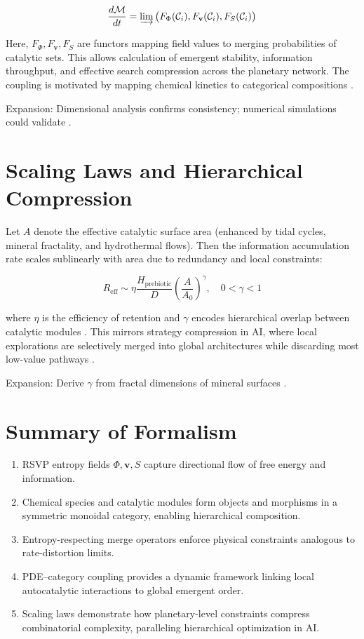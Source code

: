 \documentclass[openany]{book}
\begin{document}
\[\frac{d \mathcal{M}}{dt} = \varinjlim\big(F_\Phi(\mathcal{C}_i), F_\mathbf{v}(\mathcal{C}_i), F_S(\mathcal{C}_i)\big)\]

Here, $F_\Phi, F_\mathbf{v}, F_S$ are functors mapping field values to merging probabilities of catalytic sets. This allows calculation of emergent stability, information throughput, and effective search compression across the planetary network. The coupling is motivated by mapping chemical kinetics to categorical compositions \citep{steel2013}.

Expansion: Dimensional analysis confirms consistency; numerical simulations could validate \citep{peng2020}.

\section{Scaling Laws and Hierarchical Compression}
Let $A$ denote the effective catalytic surface area (enhanced by tidal cycles, mineral fractality, and hydrothermal flows). Then the information accumulation rate scales sublinearly with area due to redundancy and local constraints:

\[R_{\mathrm{eff}} \sim \eta \frac{H_{\mathrm{prebiotic}}}{D} \left( \frac{A}{A_0} \right)^\gamma, \quad 0 < \gamma < 1\]

where $\eta$ is the efficiency of retention and $\gamma$ encodes hierarchical overlap between catalytic modules \citep{peng2022}. This mirrors strategy compression in AI, where local explorations are selectively merged into global architectures while discarding most low-value pathways \citep{scalinghypothesis, day2024}.

Expansion: Derive $\gamma$ from fractal dimensions of mineral surfaces \citep{hazen2001}.

\section{Summary of Formalism}
\begin{enumerate}
\item RSVP entropy fields $\Phi, \mathbf{v}, S$ capture directional flow of free energy and information.
\item Chemical species and catalytic modules form objects and morphisms in a symmetric monoidal category, enabling hierarchical composition.
\item Entropy-respecting merge operators enforce physical constraints analogous to rate-distortion limits.
\item PDE–category coupling provides a dynamic framework linking local autocatalytic interactions to global emergent order.
\item Scaling laws demonstrate how planetary-level constraints compress combinatorial complexity, paralleling hierarchical optimization in AI.
\end{enumerate}
\end{document}
